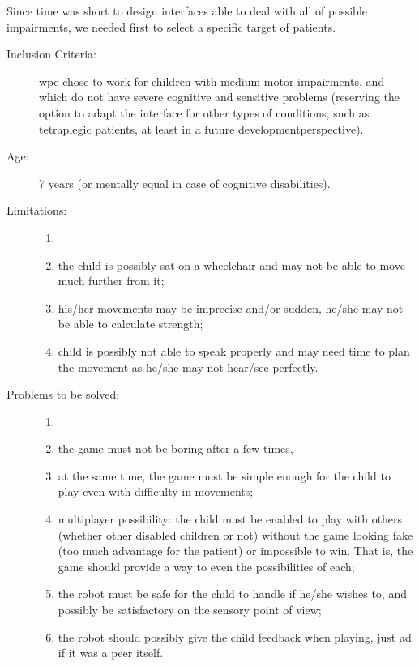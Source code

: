 \documentclass[a4paper,twoside]{book}
\begin{document}
\beforelist Since time was short to design interfaces able to deal with all of possible impairments, we needed first to select a specific target of patients.
\begin{description}
\item[Inclusion Criteria:] wpe chose to work for children with medium motor impairments, and which do not have severe cognitive and sensitive problems (reserving the option to adapt the interface for other types of conditions, such as tetraplegic patients, at least in a future development\textendash perspective).
\item[Age:] 7 years (or mentally equal in case of cognitive disabilities).
\item[Limitations:]
  \begin{enumerate}
    \item[]
    \item the child is possibly sat on a wheelchair and may not be able to move much further from it;
    \item his/her movements may be imprecise and/or sudden, he/she may not be able to calculate strength;
    \item child is possibly not able to speak properly and may need time to plan the movement as he/she may not hear/see perfectly.
  \end{enumerate}
\item[Problems to be solved:]
  \begin{enumerate}
    \item[]
    \item the game must not be boring after a few times,
    \item at the same time, the game must be simple enough for the child to play even with difficulty in movements;
    \item multi\textendash player possibility: the child must be enabled to play with others (whether other disabled children or not) without the game looking fake (too much advantage for the patient) or impossible to win. That is, the game should provide a way to even the possibilities of each;
    \item the robot must be safe for the child to handle if he/she wishes to, and possibly be satisfactory on the sensory point of view;
    \item the robot should possibly give the child feedback when playing, just ad if it was a peer itself.
  \end{enumerate}
\end{description}
\afterlist*
\end{document}
